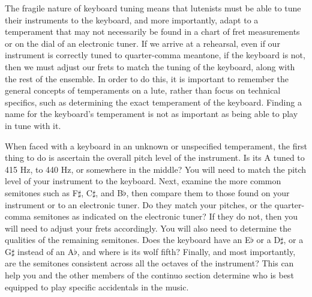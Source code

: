 The fragile nature of keyboard tuning means that lutenists must be able to tune their instruments
to the keyboard, and more importantly, adapt to a temperament that may not necessarily be found
in a chart of fret measurements or on the dial of an electronic tuner.  If we arrive at a rehearsal,
even if our instrument is correctly tuned to quarter-comma meantone, if the keyboard is not, then
we must adjust our frets to match the tuning of the keyboard, along with the rest of the ensemble.
In order to do this, it is important to remember the general concepts of temperaments on a lute,
rather than focus on technical specifics, such as determining the exact temperament of the 
keyboard.  Finding a name for the keyboard's temperament is not as important as being able to
play in tune with it.

When faced with a keyboard in an unknown or unspecified temperament, the first thing to do is
ascertain the overall pitch level of the instrument.  Is its A tuned to 415 Hz, to 440 Hz, or
somewhere in the middle?  You will need to match the pitch level of your instrument to the
keyboard.  Next, examine the more common semitones such as F$\sharp$, C$\sharp$, and B$\flat$, then
compare them to those found on your instrument or to an electronic tuner.  Do they match your
pitches, or the quarter-comma semitones as indicated on the electronic tuner?  If they do not, then
you will need to adjust your frets accordingly.  You will also need to determine the qualities of
the remaining semitones.  Does the keyboard have an E$\flat$ or a D$\sharp$, or a G$\sharp$ instead
of an A$\flat$, and where is its wolf fifth?  Finally, and most importantly, are the semitones
consistent across all the octaves of the instrument?  This can help you and the other members of the
continuo section determine who is best equipped to play specific accidentals in the music.


